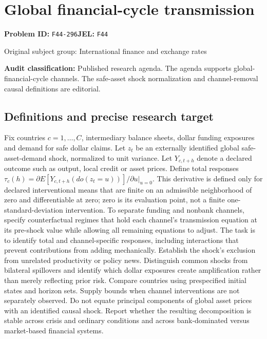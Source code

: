 \documentclass[11pt,a4paper]{article}
\begin{document}
\section*{Global financial-cycle transmission}
\textbf{Problem ID:} \texttt{F44-296}\quad \textbf{JEL:} \texttt{F44}\par
\label{problem:OP-0333}
{\sffamily\small\color{muted}Original subject group: International finance and exchange rates\par}
\label{definitions:problem:30007615}
\textbf{Audit classification:} Published research agenda. The agenda supports global-financial-cycle channels. The safe-asset shock normalization and channel-removal causal definitions are editorial.
\subsection*{Definitions and precise research target}
Fix countries \(c=1,\ldots,C\), intermediary balance sheets, dollar funding exposures and demand for safe dollar claims. Let \(z_t\) be an externally identified global safe-asset-demand shock, normalized to unit variance. Let \(Y_{c,t+h}\) denote a declared outcome such as output, local credit or asset prices. Define total responses \(\tau_c(h)=\partial E[Y_{c,t+h}(do(z_t=u))]/\partial u|_{u=0}\). This derivative is defined only for declared interventional means that are finite on an admissible neighborhood of zero and differentiable at zero; zero is its evaluation point, not a finite one-standard-deviation intervention. To separate funding and nonbank channels, specify counterfactual regimes that hold each channel's transmission equation at its pre-shock value while allowing all remaining equations to adjust. The task is to identify total and channel-specific responses, including interactions that prevent contributions from adding mechanically. Establish the shock's exclusion from unrelated productivity or policy news. Distinguish common shocks from bilateral spillovers and identify which dollar exposures create amplification rather than merely reflecting prior risk. Compare countries using prespecified initial states and horizon sets. Supply bounds when channel interventions are not separately observed. Do not equate principal components of global asset prices with an identified causal shock. Report whether the resulting decomposition is stable across crisis and ordinary conditions and across bank-dominated versus market-based financial systems.
\end{document}
